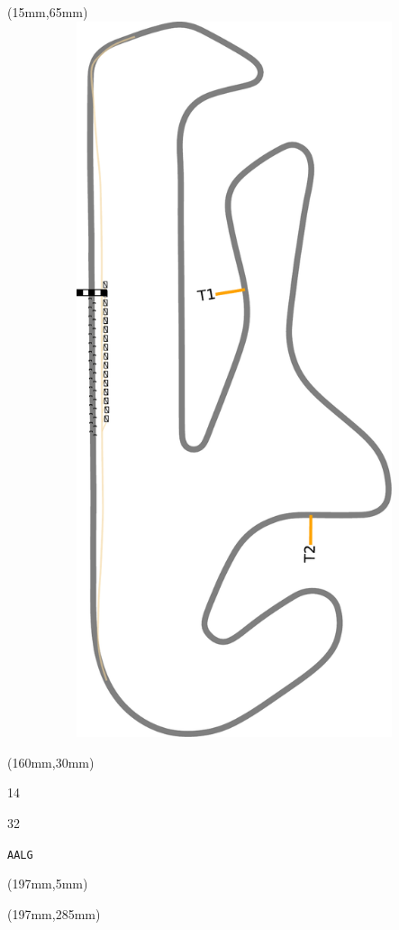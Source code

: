 \begin{textblock*}{185mm}(15mm,65mm)%
\centering
\mbox{\includegraphics[width=185mm,height=210mm,keepaspectratio]{PT/AALG.pdf}}
\end{textblock*}
\begin{textblock*}{40mm}(160mm,30mm)%
\Large
\par{} 
\par14 
\par32 
\par\hfill\tiny\tt AALG\\
\end{textblock*}
\begin{textblock*}{20mm}(197mm,5mm)%
\fbox{\thepage}
\label{AALG}
\end{textblock*}
\begin{textblock*}{20mm}(197mm,285mm)%
\fbox{\thepage}
\end{textblock*}

